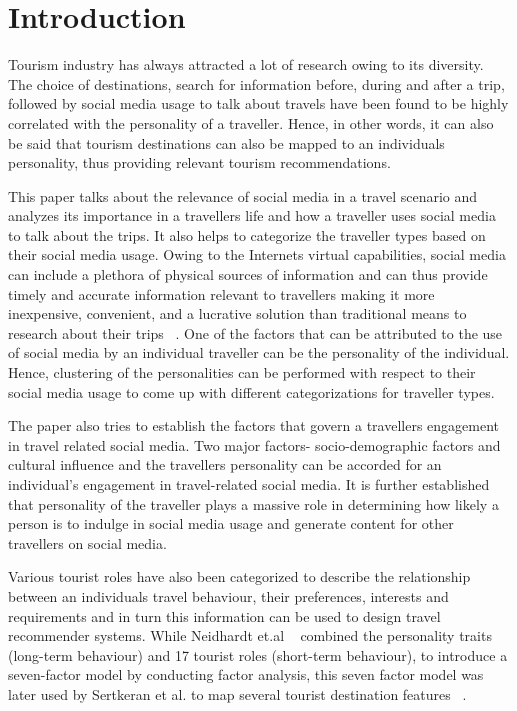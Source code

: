 \section{Introduction}
		
Tourism industry has always attracted a lot of research owing to its diversity. The choice of destinations, search for information before, during and after a trip, followed by social media usage to talk about travels have been found to be highly correlated with the personality of a traveller. Hence, in other words, it can also be said that tourism destinations can also be mapped to an individual\textquotesingle s personality, thus providing relevant tourism recommendations.


This paper talks about the relevance of social media in a travel scenario and analyzes its importance in a traveller\textquotesingle s life and how a traveller uses social media to talk about the trips.
It also helps to categorize the traveller types based on their social media usage. Owing to the Internet\textquotesingle s virtual capabilities, social media can include a plethora of physical sources of information and can thus provide timely and accurate information relevant to travellers making it more inexpensive, convenient, and a lucrative solution than traditional means to research about their trips ~\cite{amaro2016travelers}. One of the factors that can be attributed to the use of social media by an individual traveller can be the personality of the individual. Hence, clustering of the personalities can be performed with respect to their social media usage to come up with different categorizations for traveller types.
				
The paper also tries to establish the factors that govern a traveller\textquotesingle s engagement in travel related social media. Two major factors- socio-demographic factors and cultural influence and the traveller\textquotesingle s personality can be accorded for an individual's engagement in travel-related social media. It is further established that personality of the traveller plays a massive role in determining how likely a person is to indulge in social media usage and generate content for other travellers on social media. 

Various tourist roles have also been categorized to describe the relationship between an individual\textquotesingle s travel behaviour, their preferences, interests and requirements and in turn this information can be used to design travel recommender systems. While Neidhardt et.al ~\cite{neidhardt2015picture, neidhardt2014eliciting} combined the personality traits (long-term behaviour) and 17
tourist roles (short-term behaviour), to introduce a seven-factor
model by conducting factor analysis, this seven factor model was later used by Sertkeran et al. to map several tourist destination features ~\cite{sertkan2018mapping}.



